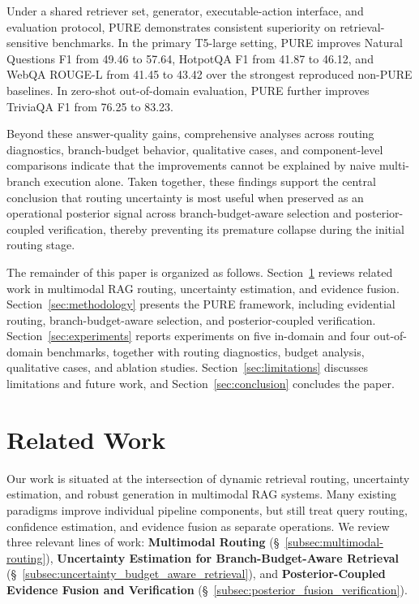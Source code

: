 \documentclass[a4paper,fleqn]{cas-dc}
\begin{document}
Under a shared retriever set, generator, executable-action interface, and evaluation protocol, PURE demonstrates consistent superiority on retrieval-sensitive benchmarks. In the primary T5-large setting, PURE improves Natural Questions F1 from 49.46 to 57.64, HotpotQA F1 from 41.87 to 46.12, and WebQA ROUGE-L from 41.45 to 43.42 over the strongest reproduced non-PURE baselines. In zero-shot out-of-domain evaluation, PURE further improves TriviaQA F1 from 76.25 to 83.23.

Beyond these answer-quality gains, comprehensive analyses across routing diagnostics, branch-budget behavior, qualitative cases, and component-level comparisons indicate that the improvements cannot be explained by naive multi-branch execution alone. Taken together, these findings support the central conclusion that routing uncertainty is most useful when preserved as an operational posterior signal across branch-budget-aware selection and posterior-coupled verification, thereby preventing its premature collapse during the initial routing stage.

The remainder of this paper is organized as follows. Section~\ref{sec:related-work} reviews related work in multimodal RAG routing, uncertainty estimation, and evidence fusion. Section~\ref{sec:methodology} presents the PURE framework, including evidential routing, branch-budget-aware selection, and posterior-coupled verification. Section~\ref{sec:experiments} reports experiments on five in-domain and four out-of-domain benchmarks, together with routing diagnostics, budget analysis, qualitative cases, and ablation studies. Section~\ref{sec:limitations} discusses limitations and future work, and Section~\ref{sec:conclusion} concludes the paper.

\section{Related Work}\label{sec:related-work}

Our work is situated at the intersection of dynamic retrieval routing, uncertainty estimation, and robust generation in multimodal RAG systems. 
Many existing paradigms improve individual pipeline components, but still treat query routing, confidence estimation, and evidence fusion as separate operations. 
We review three relevant lines of work: \textbf{Multimodal Routing} (\S~\ref{subsec:multimodal-routing}), \textbf{Uncertainty Estimation for Branch-Budget-Aware Retrieval} (\S~\ref{subsec:uncertainty_budget_aware_retrieval}), and \textbf{Posterior-Coupled Evidence Fusion and Verification} (\S~\ref{subsec:posterior_fusion_verification}).
\end{document}
